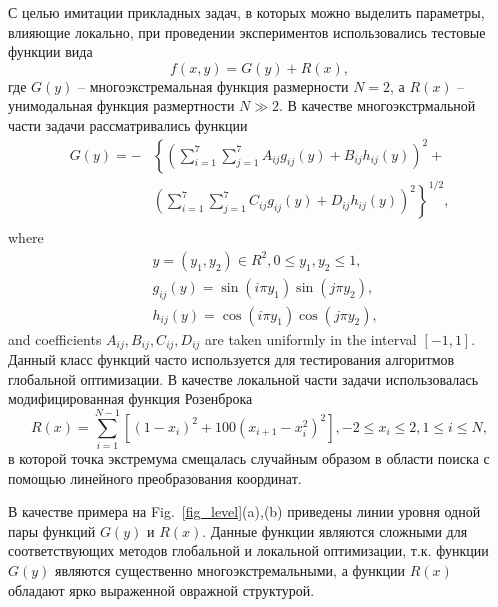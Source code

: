\documentclass{svproc}
\begin{document}
С целью имитации прикладных задач, в которых можно выделить параметры, влияющие локально, при проведении экспериментов использовались тестовые функции вида 
\begin{equation}\label{test_problem}
f(x,y) = G(y)+R(x),
\end{equation}
где $G(y)$ -- многоэкстремальная функция размерности $N=2$, а $R(x)$ -- унимодальная функция размертности $N \gg 2$.
В качестве многоэкстрмальной части задачи рассматривались функции 
\begin{eqnarray} \nonumber \label{vagris}
G(y)= -&\left\{\left(\sum^{7}_{i=1}\sum^{7}_{j=1}A_{ij}g_{ij}(y)+B_{ij}h_{ij}(y)\right)^2+\right. \\
&\left.\left(\sum^{7}_{i=1}\sum^{7}_{j=1}C_{ij}g_{ij}(y)+D_{ij}h_{ij}(y)\right)^2\right\}^{1/2},\\ \nonumber
\end{eqnarray}
where
\begin{eqnarray} \nonumber
& y=(y_1,y_2)\in R^2, 0 \leq y_1,y_2 \leq 1, \\ \nonumber
& g_{ij}(y)=\sin(i\pi y_1)\sin(j\pi y_2),  \\ \nonumber
& h_{ij}(y)=\cos(i\pi y_1)\cos(j\pi y_2), \nonumber 
\end{eqnarray}
and coefficients $A_{ij}, B_{ij}, C_{ij}, D_{ij}$  are taken uniformly in the interval $[-1,1]$.
Данный класс функций часто используется для тестирования алгоритмов глобальной оптимизации.  
В качестве локальной части задачи использовалась модифицированная функция Розенброка 
\[
R(x)= \sum_{i=1}^{N-1}{\left[(1-x_i)^2+100(x_{i+1}-x_i^2)^2\right]}, -2 \leq x_i \leq 2 , 1\leq i\leq N,
\]
в которой точка экстремума смещалась случайным образом в области поиска с помощью линейного преобразования координат.

В качестве примера на Fig.~\ref{fig_level}(a),(b) приведены линии уровня одной пары функций $G(y)$ и $R(x)$. Данные функции являются сложными для соответствующих методов глобальной и локальной оптимизации, т.к. функции $G(y)$ являются существенно многоэкстремальными, а функции $R(x)$ обладают ярко выраженной овражной структурой.
\end{document}
